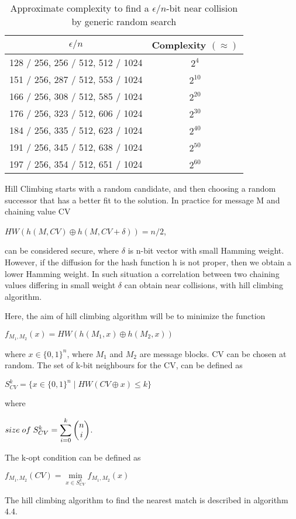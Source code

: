 \begin{table}[h]
  \begin{center}
    \begin{tabular}{ | c | c | } \hline
      $\epsilon / n $                         & Complexity $( \approx )$ \\ \hline
      128 / 256, 256 / 512, 512 / 1024 & $2^{4}$ \\ \hline
      151 / 256, 287 / 512, 553 / 1024 & $2^{10}$ \\ \hline
      166 / 256, 308 / 512, 585 / 1024 & $2^{20}$ \\ \hline
      176 / 256, 323 / 512, 606 / 1024 & $2^{30}$ \\ \hline
      184 / 256, 335 / 512, 623 / 1024 & $2^{40}$ \\ \hline
      191 / 256, 345 / 512, 638 / 1024 & $2^{50}$ \\ \hline
      197 / 256, 354 / 512, 651 / 1024 & $2^{60}$ \\ \hline
    \end{tabular}
    \caption{Approximate complexity to find a $\epsilon / n$-bit near collision by generic random search \cite{00029}}
  \end{center}
\end{table}

Hill Climbing starts with a random candidate, and then choosing a random successor that has a better fit to the
solution. In practice for message M and chaining value CV 
\begin{center}$HW( h(M, CV) \oplus h(M, CV + \delta) ) = n / 2 $,\end{center}
can be considered secure, where $\delta$ is n-bit vector with small Hamming weight. However, if the diffusion for the 
hash function h is not proper, then we obtain a lower Hamming weight. In such situation a correlation between two 
chaining values differing in small weight $\delta$ can obtain near collisions, with hill climbing algorithm.

Here, the aim of hill climbing algorithm will be to minimize the function 
\begin{center}$f_{M_{1}, M_{2}}(x) = HW( h(M_{1}, x) \oplus h(M_{2}, x) )$\end{center}
where $x \in \{0, 1\}^{n}$, where $M_{1}$ and $M_{2}$ are message blocks. CV can be chosen at random. The 
set of k-bit neighbours for the CV, can be defined as 
\begin{center}$S^{k}_{CV} = \{ x \in \{0, 1\}^{n} \mid HW( CV \oplus x ) \leq k \}$\end{center}
where 
\begin{center}$ size \thickspace of \thickspace S^{k}_{CV} = \displaystyle \sum \limits_{i = 0}^{k} \begin{pmatrix} n \\ i \end{pmatrix}$.\end{center}
The k-opt condition can be defined as 
\begin{center}$f_{M_{1}, M_{2}} (CV) =  \min\limits_{x \in S^{k}_{CV}} f_{M_{1}, M_{2}} (x)$\end{center}
The hill climbing algorithm to find the nearest match is described in algorithm 4.4. 

